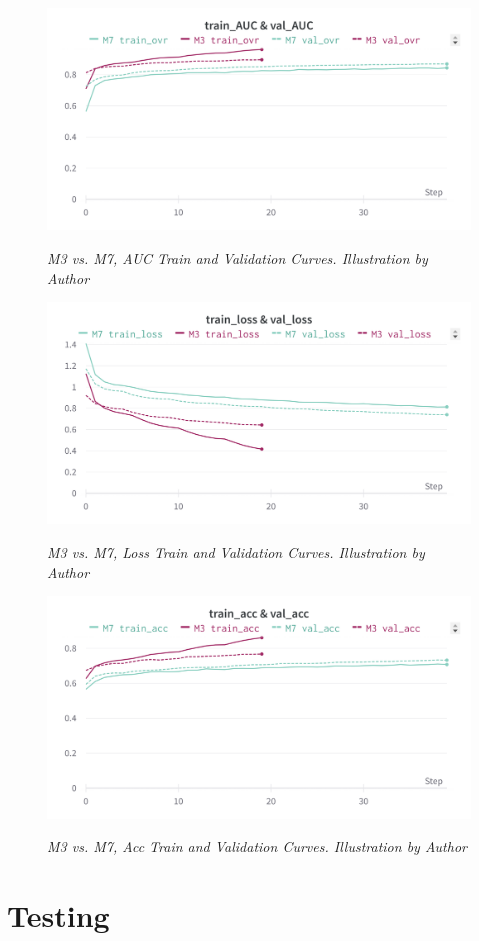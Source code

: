 \begin{figure}[H]
\centering
    \includegraphics[width=\textwidth]{imatges/results/AUCM3M7.png}
\caption[M3 vs. M7, AUC Train and Validation Curves]{\textit{M3 vs. M7, AUC Train and Validation Curves. Illustration by Author}}
{\label{fig:aucm0m4}}
\end{figure}


\begin{figure}[H]
\centering
    \includegraphics[width=\textwidth]{imatges/results/LossM3M7.png}
\caption[M3 vs. M7, Loss Train and Validation Curves]{\textit{M3 vs. M7, Loss Train and Validation Curves. Illustration by Author}}
{\label{fig:lossm0m4}}
\end{figure}

\newpage

\begin{figure}[H]
\centering
    \includegraphics[width=\textwidth]{imatges/results/AccM3M7.png}
\caption[M3 vs. M7, Acc Train and Validation Curves]{\textit{M3 vs. M7, Acc Train and Validation Curves. Illustration by Author}}
{\label{fig:accm0m4}}
\end{figure}


\section{Testing}
